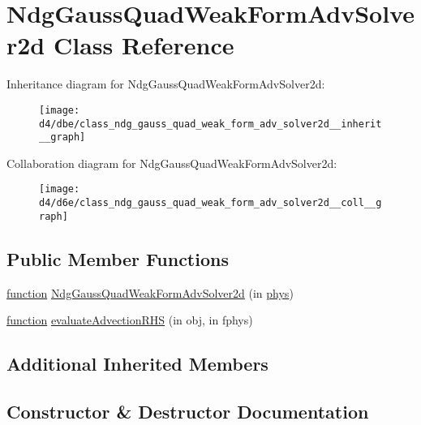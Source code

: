 \hypertarget{class_ndg_gauss_quad_weak_form_adv_solver2d}{}\section{Ndg\+Gauss\+Quad\+Weak\+Form\+Adv\+Solver2d Class Reference}
\label{class_ndg_gauss_quad_weak_form_adv_solver2d}


Inheritance diagram for Ndg\+Gauss\+Quad\+Weak\+Form\+Adv\+Solver2d\+:
\nopagebreak
\begin{figure}[H]
\begin{center}
\leavevmode
\texttt{[image: d4/dbe/class\_ndg\_gauss\_quad\_weak\_form\_adv\_solver2d\_\_inherit\_\_graph]}
\end{center}
\end{figure}


Collaboration diagram for Ndg\+Gauss\+Quad\+Weak\+Form\+Adv\+Solver2d\+:
\nopagebreak
\begin{figure}[H]
\begin{center}
\leavevmode
\texttt{[image: d4/d6e/class\_ndg\_gauss\_quad\_weak\_form\_adv\_solver2d\_\_coll\_\_graph]}
\end{center}
\end{figure}
\subsection*{Public Member Functions}
\begin{DoxyCompactItemize}
\item 
\hyperlink{class_ndg_gauss_quad_strong_form_solver_af755d69cea40fa91c0aab6b13409e11f}{function} \hyperlink{class_ndg_gauss_quad_weak_form_adv_solver2d_a2ced257e5344198f3ca5944cb7fdde5b}{Ndg\+Gauss\+Quad\+Weak\+Form\+Adv\+Solver2d} (in \hyperlink{class_ndg_abstract_adv_solver_aef07c3e090321fa7a09d8120f74f5964}{phys})
\item 
\hyperlink{class_ndg_gauss_quad_strong_form_solver_af755d69cea40fa91c0aab6b13409e11f}{function} \hyperlink{class_ndg_gauss_quad_weak_form_adv_solver2d_ab309f8575d5a124cf2dfee1c656660b4}{evaluate\+Advection\+R\+HS} (in obj, in fphys)
\end{DoxyCompactItemize}
\subsection*{Additional Inherited Members}


\subsection{Constructor \& Destructor Documentation}
\mbox{\label{class_ndg_gauss_quad_weak_form_adv_solver2d_a2ced257e5344198f3ca5944cb7fdde5b}} 
